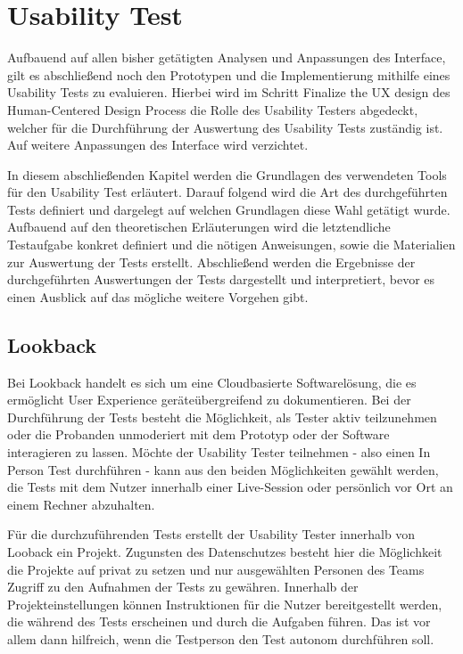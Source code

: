 \chapter{Usability Test}\label{ch:outlook}

Aufbauend auf allen bisher getätigten Analysen und Anpassungen des Interface, gilt es abschließend noch den Prototypen und die Implementierung mithilfe eines Usability Tests zu evaluieren.
Hierbei wird im Schritt \glqq Finalize the UX design\grqq{} des Human-Centered Design Process die Rolle des Usability Testers abgedeckt, welcher für die Durchführung der Auswertung des Usability Tests zuständig ist.
Auf weitere Anpassungen des Interface wird verzichtet.

In diesem abschließenden Kapitel werden die Grundlagen des verwendeten Tools für den Usability Test erläutert.
Darauf folgend wird die Art des durchgeführten Tests definiert und dargelegt auf welchen Grundlagen diese Wahl getätigt wurde.
Aufbauend auf den theoretischen Erläuterungen wird die letztendliche Testaufgabe konkret definiert und die nötigen Anweisungen, sowie die Materialien zur Auswertung der Tests erstellt.
Abschließend werden die Ergebnisse der durchgeführten Auswertungen der Tests dargestellt und interpretiert, bevor es einen Ausblick auf das mögliche weitere Vorgehen gibt.

\section{Lookback}

Bei Lookback handelt es sich um eine Cloudbasierte Softwarelösung, die es ermöglicht User Experience geräteübergreifend zu dokumentieren.
Bei der Durchführung der Tests besteht die Möglichkeit, als Tester aktiv teilzunehmen oder die Probanden unmoderiert mit dem Prototyp oder der Software interagieren zu lassen.
Möchte der Usability Tester teilnehmen -  also einen \glqq In Person\grqq{} Test durchführen - kann aus den beiden Möglichkeiten gewählt werden, die Tests mit dem Nutzer innerhalb einer Live-Session oder persönlich vor Ort an einem Rechner abzuhalten.

Für die durchzuführenden Tests erstellt der Usability Tester innerhalb von Looback ein Projekt.
Zugunsten des Datenschutzes besteht hier die Möglichkeit die Projekte auf privat zu setzen und nur ausgewählten Personen des Teams Zugriff zu den Aufnahmen  der Tests zu gewähren.
Innerhalb der Projekteinstellungen können Instruktionen für die Nutzer bereitgestellt werden, die während des Tests erscheinen und durch die Aufgaben führen.
Das ist vor allem dann hilfreich, wenn die Testperson den Test autonom durchführen soll.

